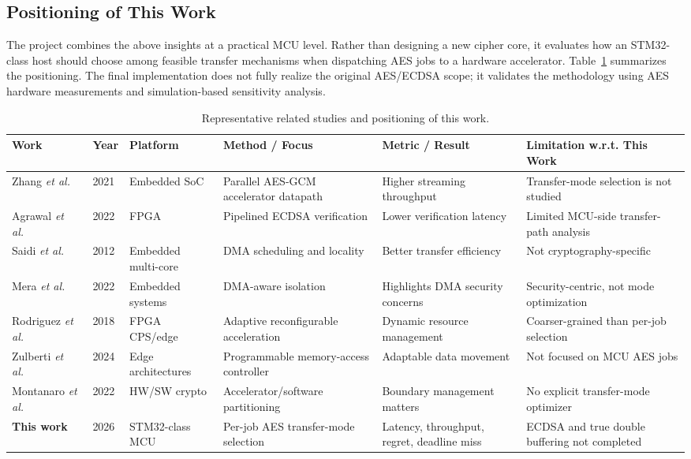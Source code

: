 \documentclass[conference]{IEEEtran}
\begin{document}
\subsection{Positioning of This Work}
The project combines the above insights at a practical MCU level. Rather than designing a new cipher core, it evaluates how an STM32-class host should choose among feasible transfer mechanisms when dispatching AES jobs to a hardware accelerator. Table~\ref{tab:related_work} summarizes the positioning. The final implementation does not fully realize the original AES/ECDSA scope; it validates the methodology using AES hardware measurements and simulation-based sensitivity analysis.

\begin{table}[ht!]
\centering
\caption{Representative related studies and positioning of this work.}
\label{tab:related_work}
\scriptsize
\setlength{\tabcolsep}{3pt}
\begin{adjustbox}{width=\columnwidth}
\begin{tabular}{p{2.15cm} p{0.8cm} p{1.35cm} p{2.0cm} p{1.95cm} p{2.10cm}}
\toprule
\textbf{Work} & \textbf{Year} & \textbf{Platform} & \textbf{Method / Focus} & \textbf{Metric / Result} & \textbf{Limitation w.r.t. This Work} \\
\midrule
Zhang \emph{et al.}~\cite{zhang2021} & 2021 & Embedded SoC & Parallel AES-GCM accelerator datapath & Higher streaming throughput & Transfer-mode selection is not studied \\
Agrawal \emph{et al.}~\cite{agrawal2022} & 2022 & FPGA & Pipelined ECDSA verification & Lower verification latency & Limited MCU-side transfer-path analysis \\
Saidi \emph{et al.}~\cite{Saidi2012} & 2012 & Embedded multi-core & DMA scheduling and locality & Better transfer efficiency & Not cryptography-specific \\
Mera \emph{et al.}~\cite{Mera2022} & 2022 & Embedded systems & DMA-aware isolation & Highlights DMA security concerns & Security-centric, not mode optimization \\
Rodriguez \emph{et al.}~\cite{Rodrguez2018} & 2018 & FPGA CPS/edge & Adaptive reconfigurable acceleration & Dynamic resource management & Coarser-grained than per-job selection \\
Zulberti \emph{et al.}~\cite{Zulberti2024} & 2024 & Edge architectures & Programmable memory-access controller & Adaptable data movement & Not focused on MCU AES jobs \\
Montanaro \emph{et al.}~\cite{Montanaro2022} & 2022 & HW/SW crypto & Accelerator/software partitioning & Boundary management matters & No explicit transfer-mode optimizer \\
\textbf{This work} & 2026 & STM32-class MCU & Per-job AES transfer-mode selection & Latency, throughput, regret, deadline miss & ECDSA and true double buffering not completed \\
\bottomrule
\end{tabular}
\end{adjustbox}
\end{table}
\end{document}
